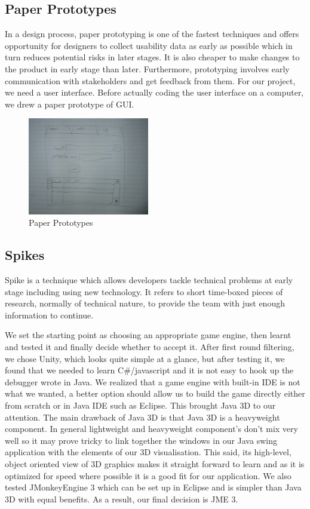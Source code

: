 \documentclass[10pt, a4paper]{article}
\begin{document}
\subsection{Paper Prototypes}
 	
In a design process, paper prototyping is one of the fastest techniques and offers opportunity for designers to collect usability data as early as possible which in turn reduces potential risks in later stages. It is also cheaper to make changes to the product in early stage than later. Furthermore, prototyping involves early communication with stakeholders and get feedback from them. For our project, we need a user interface. Before actually coding the user interface on a computer, we drew a paper prototype of GUI.

\begin{figure}[h]
        \centering
        \includegraphics[width=200px]{images/paper_prototype.JPG}
        \caption{Paper Prototypes}
\end{figure}

\subsection{Spikes}

Spike is a technique which allows developers tackle technical problems at early stage including using new technology. It refers to short time-boxed pieces of research, normally of technical nature, to provide the team with just enough information to continue.

We set the starting point as choosing an appropriate game engine, then learnt and tested it and finally decide whether to accept it. After first round filtering, we chose Unity, which looks quite simple at a glance, but after testing it, we found that we needed to learn C{\#}/javascript and it is not easy to hook up the debugger wrote in Java. We realized that a game engine with built-in IDE is not what we wanted, a better option should allow us to build the game directly either from scratch or in Java IDE such as Eclipse. This brought Java 3D to our attention. The main drawback of Java 3D is that Java 3D is a heavyweight component. In general lightweight and heavyweight component’s don’t mix very well so it may prove tricky to link together the windows in our Java swing application with the elements of our 3D visualisation. This said, its high-level, object oriented view of 3D graphics makes it straight forward to learn and as it is optimized for speed where possible it is a good fit for our application. We also tested JMonkeyEngine 3 which can be set up in Eclipse and is simpler than Java 3D with equal benefits. As a result, our final decision is JME 3. 
\end{document}
